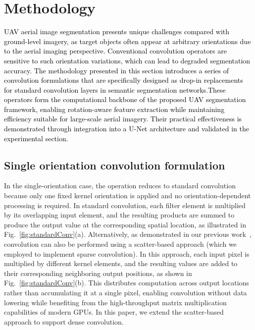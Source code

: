 
\section{Methodology} \label{sec:methodology}

\textcolor{black}{
UAV aerial image segmentation presents unique challenges compared with ground-level imagery, as target objects often appear at arbitrary orientations due to the aerial imaging perspective. Conventional convolution operators are sensitive to such orientation variations, which can lead to degraded segmentation accuracy. The methodology presented in this section introduces a series of convolution formulations that are specifically designed as drop-in replacements for standard convolution layers in semantic segmentation networks.These operators form the computational backbone of the proposed UAV segmentation framework, enabling rotation-aware feature extraction while maintaining efficiency suitable for large-scale aerial imagery. Their practical effectiveness is demonstrated through integration into a U-Net architecture and validated in the experimental section.
}


\subsection{Single orientation convolution formulation}
In the single-orientation case, the operation reduces to standard convolution because only one fixed kernel orientation is applied and no orientation-dependent processing is required. In standard convolution, each filter element is multiplied by its overlapping input element, and the resulting products are summed to produce the output value at the corresponding spatial location, as illustrated in Fig.~\ref{fig:standardConv}(a). Alternatively, as demonstrated in our previous work~\cite{manduhu2025airbornesensedetectdrones}, convolution can also be performed using a scatter-based approach (which we employed to implement sparse convolution). In this approach, each input pixel is multiplied by different kernel elements, and the resulting values are added to their corresponding neighboring output positions, as shown in Fig.~\ref{fig:standardConv}(b). This distributes computation across output locations rather than accumulating it at a single pixel, enabling convolution without data lowering while benefiting from the high-throughput matrix multiplication capabilities of modern GPUs. In this paper, we extend the scatter-based approach to support dense convolution.


